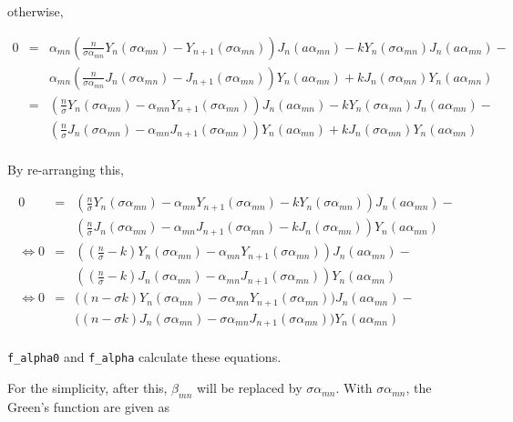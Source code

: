 \documentclass{article}
\newcommand{\inlinecode}[1]{{\colorbox[rgb]{0.9,0.9,0.9}{\lstinline|#1|}}}
\begin{document}
otherwise,

\begin{eqnarray}
    0 &=& \alpha_{mn}\left(\frac{n}{\sigma\alpha_{mn}}Y_n(\sigma\alpha_{mn}) - Y_{n+1}(\sigma\alpha_{mn})\right)J_n\left(a\alpha_{mn}\right) - kY_n(\sigma\alpha_{mn})J_n\left(a\alpha_{mn}\right) -\\
      & & \alpha_{mn}\left(\frac{n}{\sigma\alpha_{mn}}J_n(\sigma\alpha_{mn}) - J_{n+1}(\sigma\alpha_{mn})\right)Y_n\left(a\alpha_{mn}\right) + kJ_n(\sigma\alpha_{mn})Y_n\left(a\alpha_{mn}\right)  \\
      &=& \left(\frac{n}{\sigma}Y_n(\sigma\alpha_{mn}) - \alpha_{mn}Y_{n+1}(\sigma\alpha_{mn})\right)J_n\left(a\alpha_{mn}\right) - kY_n(\sigma\alpha_{mn})J_n\left(a\alpha_{mn}\right) -\\
      & & \left(\frac{n}{\sigma}J_n(\sigma\alpha_{mn}) - \alpha_{mn}J_{n+1}(\sigma\alpha_{mn})\right)Y_n\left(a\alpha_{mn}\right) + kJ_n(\sigma\alpha_{mn})Y_n\left(a\alpha_{mn}\right) \\
\end{eqnarray}

By re-arranging this,

\begin{eqnarray}
    0 &=& \left(\frac{n}{\sigma}Y_n(\sigma\alpha_{mn}) - \alpha_{mn}Y_{n+1}(\sigma\alpha_{mn}) - kY_n(\sigma\alpha_{mn})\right) J_n(a\alpha_{mn}) -\\
      & & \left(\frac{n}{\sigma}J_n(\sigma\alpha_{mn}) - \alpha_{mn}J_{n+1}(\sigma\alpha_{mn}) - kJ_n(\sigma\alpha_{mn})\right) Y_n(a\alpha_{mn})\\
\Leftrightarrow
    0 &=& \left(\left(\frac{n}{\sigma} - k\right) Y_n(\sigma\alpha_{mn}) - \alpha_{mn}Y_{n+1}(\sigma\alpha_{mn})\right) J_n(a\alpha_{mn}) -\\
      & & \left(\left(\frac{n}{\sigma} - k\right) J_n(\sigma\alpha_{mn}) - \alpha_{mn}J_{n+1}(\sigma\alpha_{mn})\right) Y_n(a\alpha_{mn})\\
\Leftrightarrow
    0 &=& \Big((n - \sigma k) Y_n(\sigma\alpha_{mn}) - \sigma\alpha_{mn}Y_{n+1}(\sigma\alpha_{mn})\Big) J_n(a\alpha_{mn}) -\\
      & & \Big((n - \sigma k) J_n(\sigma\alpha_{mn}) - \sigma\alpha_{mn}J_{n+1}(\sigma\alpha_{mn})\Big) Y_n(a\alpha_{mn})\\
\end{eqnarray}

\inlinecode{f_alpha0} and \inlinecode{f_alpha} calculate these equations.

For the simplicity, after this, $\beta_{mn}$ will be replaced by $\sigma\alpha_{mn}$.
With $\sigma\alpha_{mn}$, the Green's function are given as
\end{document}
